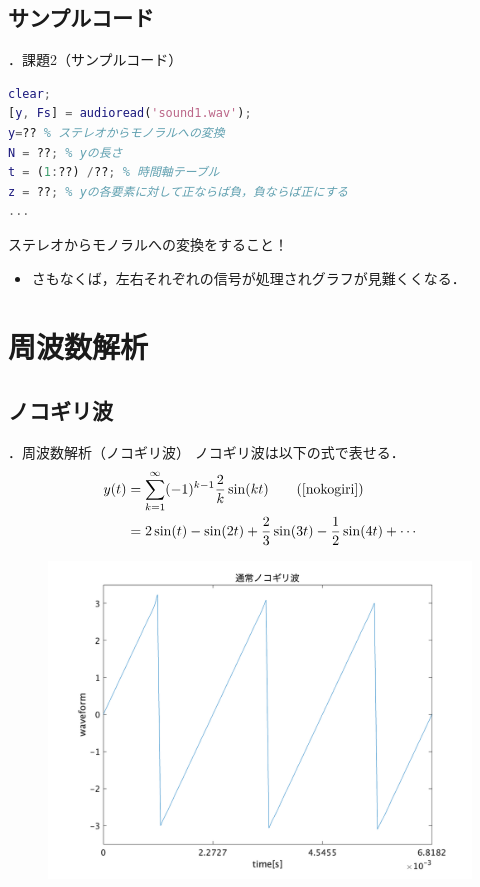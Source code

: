 \documentclass[aspectratio=43]{beamer}
\newcommand{\showsec}{\thesection ．}
\begin{document}
\subsection{サンプルコード}
\begin{frame}[t,containsverbatim]{\showsec 課題2（サンプルコード）}
    \begin{lstlisting}[language={Matlab}]
clear;
[y, Fs] = audioread('sound1.wav');
y=?? % ステレオからモノラルへの変換
N = ??; % yの長さ
t = (1:??) /??; % 時間軸テーブル
z = ??; % yの各要素に対して正ならば負，負ならば正にする
...
    \end{lstlisting}
    \begin{alertblock}{}
        ステレオからモノラルへの変換をすること！
        \begin{itemize}
            \item さもなくば，左右それぞれの信号が処理されグラフが見難くくなる．
        \end{itemize}
    \end{alertblock}
\end{frame}
\section{周波数解析}
\subsection{ノコギリ波}
\begin{frame}[t]{\showsec 周波数解析（ノコギリ波）}
    ノコギリ波は以下の式で表せる．
    \begin{align}
        y(t) & = \sum_{k=1}^{\infty}(-1)^{k-1}\dfrac{2}{k}\sin(kt)\tag{\ref{nokogiri}}    \\
             & = 2\sin(t) - \sin(2t) + \frac{2}{3}\sin(3t) - \frac{1}{2}\sin(4t) + \cdots
    \end{align}
    \begin{figure}
        \includegraphics[keepaspectratio,height=0.5\textheight]{nokogiri.png}
    \end{figure}
\end{frame}
\end{document}
